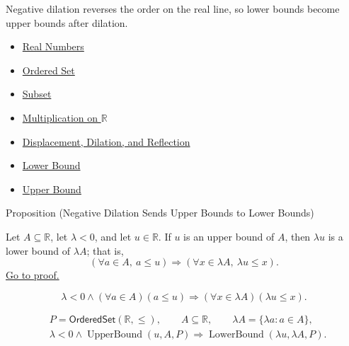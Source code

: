\begin{remark*}[Interpretation]
Negative dilation reverses the order on the real line, so lower bounds become
upper bounds after dilation.
\end{remark*}

\begin{dependencies}
\begin{itemize}
  \item \hyperref[def:reals]{Real Numbers}
  \item \hyperref[def:ordered-set]{Ordered Set}
  \item \hyperref[def:subset]{Subset}
  \item \hyperref[def:multiplication-on-r]{Multiplication on $\mathbb{R}$}
  \item \hyperref[def:displacement-dilation-reflection]{Displacement, Dilation, and Reflection}
  \item \hyperref[def:real-lower-bound]{Lower Bound}
  \item \hyperref[def:real-upper-bound]{Upper Bound}
\end{itemize}
\end{dependencies}

\begin{propositionbox}{Proposition (Negative Dilation Sends Upper Bounds to Lower Bounds)}
\begin{proposition}
\label{prop:negative-dilation-sends-upper-to-lower-bounds}
Let $A\subseteq\mathbb{R}$, let $\lambda<0$, and let $u\in\mathbb{R}$.
If $u$ is an upper bound of $A$, then $\lambda u$ is a lower bound of
$\lambda A$; that is,
\[
\left(\forall a\in A,\ a\leq u\right)
\Longrightarrow
\left(\forall x\in\lambda A,\ \lambda u\leq x\right).
\]
\hyperref[prf:negative-dilation-sends-upper-to-lower-bounds]{Go to proof.}
\end{proposition}
\end{propositionbox}

\begin{remark*}
\[
\lambda<0\land(\forall a\in A)(a\leq u)
\Longrightarrow
(\forall x\in\lambda A)(\lambda u\leq x).
\]
\end{remark*}

\begin{remark*}
\[
\begin{aligned}
&P=\mathsf{OrderedSet}(\mathbb{R},\leq),\qquad
A\subseteq\mathbb{R},\qquad \lambda A=\{\lambda a:a\in A\},\\
&\lambda<0\land\operatorname{UpperBound}(u,A,P)
\Longrightarrow\operatorname{LowerBound}(\lambda u,\lambda A,P).
\end{aligned}
\]
\end{remark*}

